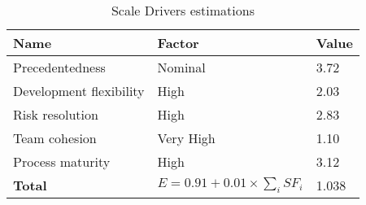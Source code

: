 \begin{table}[!htbp]
    \centering
    \begin{tabular}{| l | l | l |}
        \hline
        \textbf{Name}             & \textbf{Factor}   & \textbf{Value}    \\
        \hline
        Precedentedness           & Nominal           & 3.72                 \\
        \hline
        Development flexibility   & High          	  & 2.03                 \\
        \hline
        Risk resolution           & High              & 2.83                 \\
        \hline
        Team cohesion             & Very High         & 1.10                 \\
        \hline
        Process maturity          & High              & 3.12                 \\
        \hline
        \textbf{Total}  & \multicolumn{1}{|c|}{$E=0.91 + 0.01 \times \sum_{i}SF_i$}    & 1.038       \\
        \hline
    \end{tabular}
    \caption{Scale Drivers estimations}
    \label{tab:scale-drivers}
\end{table}